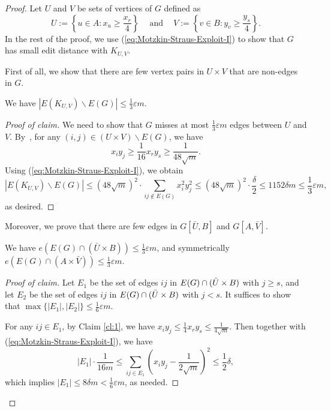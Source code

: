 \documentclass[10pt,a4paper]{amsart}
\newcommand*{\abs}[1]{\lvert#1\rvert}
\newenvironment{poc}{\begin{proof}[Proof of claim]\renewcommand*{\qedsymbol}{$\blacksquare$}}{\end{proof}}
\begin{document}
\begin{proof}
     Let $U$ and $V$ be sets of vertices of $G$ defined as  
    \[ 
    U := \left\{u\in A: x_u \geq \frac{x_r}{ 4} \right\} 
    \quad~\text{and}~\quad 
    V := \left\{v \in B: y_v \geq \frac{y_s}{4} \right\}. \]
    In the rest of the proof, we use (\ref{eq:Motzkin-Straus-Exploit-I}) to show that $G$ has small edit distance with $K_{U, V}$. 
    
    First of all, we show that there are few  vertex pairs in $U \times V$ that are non-edges in $G$. 

\begin{claim}\label{cl:2}
We have $|E(K_{U, V}) \backslash E(G)| \leq \frac{1}{3} \varepsilon m $.
 \end{claim}  
  
    \begin{poc}
    We need to show that $G$ misses at most $\frac{1}{3} \varepsilon m$ edges between $U$ 
    and $V$.  By~, for any $(i, j) \in (U\times V) \backslash E(G)$, we have 
    $$x_i y_j \geq \frac{1}{16} x_r y_s  \geq  \frac{1}{48 \sqrt{m}}.$$ 
    Using (\ref{eq:Motzkin-Straus-Exploit-I}), we obtain
        $$|E(K_{U, V}) \backslash E(G)| \leq 
        (48\sqrt{m})^2 \cdot \sum_{ij \notin E(G)} x_i^2 y_j^2
        \leq 
        (48 \sqrt{m})^{2} \cdot \frac{\delta}{2} 
        \leq 1152 \delta m \leq \frac{1}{3} \varepsilon m ,$$
        as desired.
    \end{poc}

    Moreover, we prove that there are few edges in $G[\bar{U},B]$ and 
    $G[A,\bar{V}]$. 

\begin{claim}\label{cl:3}
    We have $e(E(G) \cap (\bar{U} \times B)) \leq \frac{1}{3} \varepsilon m $, and symmetrically $e(E(G) \cap (A \times \bar{V})) \leq \frac{1}{3} \varepsilon m $.
\end{claim} 
    
    \begin{poc}
        Let $E_1$ be the set of edges $ij$ in $E(G) \cap (\Bar{U} \times B)$ with $j \geq s$, and let $E_2$ be the set of edges $ij$ in $E(G) \cap (\Bar{U} \times B)$ with $j < s$. It suffices to show that $\max\{\abs{E_1}, \abs{E_2}\} \leq 
        \frac{1}{6} \varepsilon m $.

        For any $ij \in E_1$, by Claim \ref{cl:1}, we have $x_i y_j \leq \frac{1}{4} x_r y_s  \leq \frac{1}{4\sqrt{m}}$. Then together with (\ref{eq:Motzkin-Straus-Exploit-I}), we have 
        $$\abs{E_1} \cdot \frac{1}{16 m} \leq \sum_{ij \in E_1} \left(x_i y_j - \frac{1}{2\sqrt{m}} \right)^2 \leq \frac{1}{2}\delta , $$
        which implies $\abs{E_1} \leq 8 \delta m < \frac{1}{6} \varepsilon m $, as needed. 


\end{poc}
\end{proof}
\end{document}
